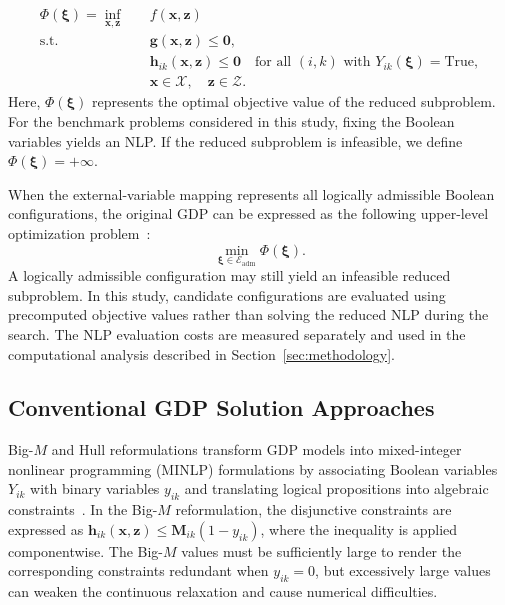 \documentclass{article}
\begin{document}
\begin{equation}\label{eqn:Sub}
\begin{aligned}
\Phi(\boldsymbol\xi)=\inf_{\mathbf x,\mathbf z}\quad &f(\mathbf x,\mathbf z)\\
\text{s.t.}\quad &\mathbf g(\mathbf x,\mathbf z)\leq\mathbf 0,\\
&\mathbf h_{ik}(\mathbf x,\mathbf z)\leq\mathbf 0
\quad\text{for all }(i,k)\text{ with }Y_{ik}(\boldsymbol\xi)=\mathrm{True},\\
&\mathbf x\in\mathcal X,\quad\mathbf z\in\mathcal Z.
\end{aligned}\tag{Sub}
\end{equation}
Here, \(\Phi(\boldsymbol\xi)\) represents the optimal objective value of the reduced subproblem. 
For the benchmark problems considered in this study, fixing the Boolean variables yields an NLP. 
If the reduced subproblem is infeasible, we define \(\Phi(\boldsymbol\xi)=+\infty\).

When the external-variable mapping represents all logically admissible Boolean configurations, the original GDP can be expressed as the following upper-level optimization problem~\cite{ovalle2025logic}:
\begin{equation}\label{eqn:outer.value}
\min_{\boldsymbol\xi\in\mathcal E_{\mathrm{adm}}}\Phi(\boldsymbol\xi).
\end{equation}
A logically admissible configuration may still yield an infeasible reduced subproblem.
In this study, candidate configurations are evaluated using precomputed objective values rather than solving the reduced NLP during the search. 
The NLP evaluation costs are measured separately and used in the computational analysis described in Section~\ref{sec:methodology}.

\subsection{Conventional GDP Solution Approaches}
 
Big-\(M\) and Hull reformulations transform GDP models into mixed-integer nonlinear programming (MINLP) formulations by associating Boolean variables \(Y_{ik}\) with binary variables \(y_{ik}\) and translating logical propositions into algebraic constraints~\cite{raman1994modelling,grossmann2003hull}. 
In the Big-\(M\) reformulation, the disjunctive constraints are expressed as \(\mathbf h_{ik}(\mathbf x,\mathbf z)\leq\mathbf M_{ik}(1-y_{ik})\), where the inequality is applied componentwise. 
The Big-\(M\) values must be sufficiently large to render the corresponding constraints redundant when \(y_{ik}=0\), but excessively large values can weaken the continuous relaxation and cause numerical difficulties.
\end{document}
